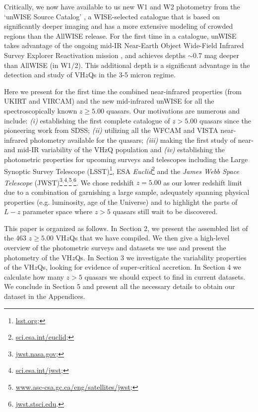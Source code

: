 \documentclass[usenatbib]{mnras}
\begin{document}
Critically, we now have available to us new W1 and W2 photometry from the `unWISE Source Catalog' \citep[][]{Schlafly2019}, a WISE-selected catalogue that is based on significantly deeper imaging and has a more extensive modeling of crowded regions than the AllWISE release. For the first time in a catalogue, unWISE takes advantage of the ongoing mid-IR Near-Earth Object Wide-Field Infrared Survey Explorer Reactivation mission \citep[NEOWISE-R; ][]{Mainzer2014}, and achieves depths $\sim$0.7 mag deeper than AllWISE (in W1/2).  This additional depth is a significant advantage in the detection and study of VH$z$Qs in the 3-5 micron regime.

Here we present for the first time the combined near-infrared properties (from UKIRT and VIRCAM) and the new mid-infrared unWISE for
all the spectroscopically known $z\geq5.00$ quasars. Our motivations are numerous and include: {\it (i)} establishing the first complete
catalogue of $z>5.00$ quasars since the pioneering work from SDSS; {\it (ii)} utilizing all the WFCAM and VISTA near-infrared photometry
available for the quasars; {\it (iii)} making the first study of near- and mid-IR variability of the VHzQ population and {\it (iv)} establishing the photometric properties for upcoming surveys and telescopes including the Large Synoptic Survey Telescope (LSST)\footnote{\href{https://www.lsst.org}{lsst.org};}, ESA {\it Euclid}\footnote{\href{https://sci.esa.int/euclid/}{sci.esa.int/euclid};} and the {\it James Webb Space Telescope} (JWST)\footnote{\href{https://www.jwst.nasa.gov/}{jwst.nasa.gov};}$^,$\footnote{\href{https://sci.esa.int/jwst/}{sci.esa.int/jwst};}$^,$\footnote{\href{https://www.asc-csa.gc.ca/eng/satellites/jwst/}{www.asc-csa.gc.ca/eng/satellites/jwst};}$^,$\footnote{\href{https://jwst.stsci.edu/}{jwst.stsci.edu}.}. We chose redshift $z=5.00$ as our lower redshift limit due to a combination of garnishing a large sample, adequately spanning physical properties (e.g. luminosity, age of the Universe) and to highlight the parts of $L-z$ parameter space where $z>5$ quasars still wait to be discovered.

This paper is organized as follows. In Section 2, we present the
assembled list of the 463 $z\geq5.00$ VH$z$Qs that we have
compiled. We then give a high-level overview of the photometric
surveys and datasets we use and present the photometry of the
VH$z$Qs. In Section 3 we investigate the variability properties of the
VH$z$Qs, looking for evidence of super-critical accretion. In Section
4 we calculate how many $z>5$ quasars we should expect to find in
current datasets. We conclude in Section 5 and present all the
necessary details to obtain our dataset in the Appendices.
\end{document}
